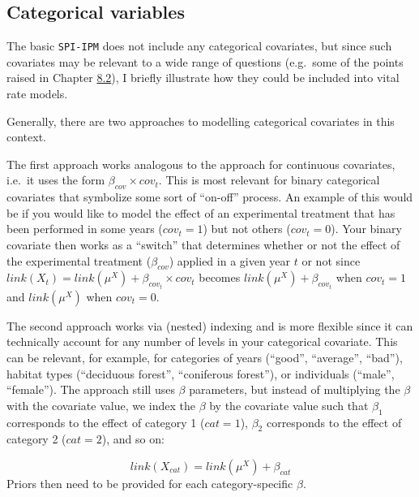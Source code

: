 \documentclass[
]{book}
\begin{document}
\hypertarget{categorical-variables}{%
\subsection{Categorical variables}\label{categorical-variables}}

The basic \texttt{SPI-IPM} does not include any categorical covariates, but since such
covariates may be relevant to a wide range of questions (e.g.~some of the points
raised in Chapter \protect\hyperlink{ux5cux23ux5cux2520Adaptingux5cux2520theux5cux2520populationux5cux2520modelux5cux2520forux5cux2520yourux5cux2520speciesux2fpopulation}{8.2}),
I briefly illustrate how they could be included into vital rate models.

Generally, there are two approaches to modelling categorical covariates in this
context.

The first approach works analogous to the approach for continuous covariates,
i.e.~it uses the form \(\beta_{cov}\times cov_t\). This is most relevant for
binary categorical covariates that symbolize some sort of ``on-off'' process. An
example of this would be if you would like to model the effect of an experimental
treatment that has been performed in some years (\(cov_t = 1\)) but not others
(\(cov_t = 0\)). Your binary covariate then works as a ``switch'' that determines
whether or not the effect of the experimental treatment (\(\beta_{cov}\)) applied
in a given year \(t\) or not since \(link(X_t) = link(\mu^X) + \beta_{cov_t}\times cov_t\) becomes \(link(\mu^X) + \beta_{cov_t}\) when \(cov_t = 1\) and \(link(\mu^X)\)
when \(cov_t = 0\).

The second approach works via (nested) indexing and is more flexible since it
can technically account for any number of levels in your categorical covariate.
This can be relevant, for example, for categories of years (``good'', ``average'',
``bad''), habitat types (``deciduous forest'', ``coniferous forest''), or individuals
(``male'', ``female'').
The approach still uses \(\beta\) parameters, but instead of multiplying the
\(\beta\) with the covariate value, we index the \(\beta\) by the covariate value
such that \(\beta_1\) corresponds to the effect of category 1 (\(cat = 1\)),
\(\beta_2\) corresponds to the effect of category 2 (\(cat = 2\)), and so on:

\begin{equation}
  link(X_{cat}) = link(\mu^X) + \beta_{cat}
\end{equation}
Priors then need to be provided for each category-specific \(\beta\).
\end{document}
